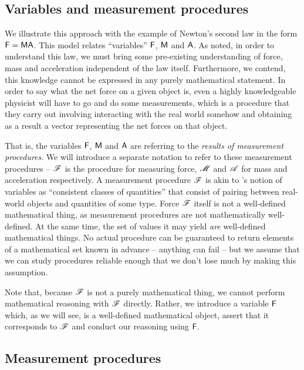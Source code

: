 \subsection{Variables and measurement procedures}

We illustrate this approach with the example of Newton's second law in the form $\mathsf{F}=\mathsf{MA}$. This model relates ``variables'' $\mathsf{F}$, $\mathsf{M}$ and $\mathsf{A}$. As \citet{feynman_feynman_1979} noted, in order to understand this law, we must bring some pre-existing understanding of force, mass and acceleration independent of the law itself. Furthermore, we contend, this knowledge cannot be expressed in any purely mathematical statement. In order to say what the net force on a given object is, even a highly knowledgeable physicist will have to go and do some measurements, which is a procedure that they carry out involving interacting with the real world somehow and obtaining as a result a vector representing the net forces on that object.

That is, the variables $\mathsf{F}$, $\mathsf{M}$ and $\mathsf{A}$ are referring to the \emph{results of measurement procedures}. We will introduce a separate notation to refer to these measurement procedures -- $\mathscr{F}$ is the procedure for measuring force, $\mathscr{M}$ and $\mathscr{A}$ for mass and acceleration respectively. A measurement procedure $\mathscr{F}$ is akin to \citet{menger_random_2003}'s notion of variables as ``consistent classes of quantities'' that consist of pairing between real-world objects and quantities of some type. Force $\mathscr{F}$ itself is not a well-defined mathematical thing, as measurement procedures are not mathematically well-defined. At the same time, the set of values it may yield \emph{are} well-defined mathematical things. No actual procedure can be guaranteed to return elements of a mathematical set known in advance -- anything can fail -- but we assume that we can study procedures reliable enough that we don't lose much by making this assumption.

Note that, because $\mathscr{F}$ is not a purely mathematical thing, we cannot perform mathematical reasoning with $\mathscr{F}$ directly. Rather, we introduce a variable $\mathsf{F}$ which, as we will see, is a well-defined mathematical object, assert that it corresponds to $\mathscr{F}$ and conduct our reasoning using $\mathsf{F}$.

\subsection{Measurement procedures}\label{sec:mprocs}

